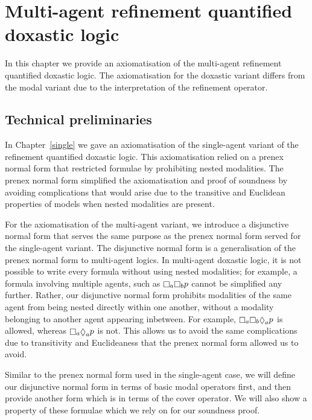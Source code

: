 \chapter{Multi-agent refinement quantified doxastic logic}\label{kd45}

In this chapter we provide an axiomatisation of the multi-agent refinement
quantified doxastic logic. The axiomatisation for the doxastic variant differs
from the modal variant due to the interpretation of the refinement operator.

\section{Technical preliminaries}

In Chapter~\ref{single} we gave an axiomatisation of the single-agent variant of
the refinement quantified doxastic logic. This axiomatisation relied on a
prenex normal form that restricted formulae by prohibiting nested modalities.
The prenex normal form simplified the axiomatisation and proof of soundness by
avoiding complications that would arise due to the transitive and Euclidean
properties of \classKD{} models when nested modalities are present.

For the axiomatisation of the multi-agent variant, we introduce a disjunctive
normal form that serves the same purpose as the prenex normal form served for
the single-agent variant. The disjunctive normal form is a generalisation of the
prenex normal form to multi-agent logics. In multi-agent doxastic logic, it is
not possible to write every formula without using nested modalities; for
example, a formula involving multiple agents, such as $\knows_a \knows_b p$
cannot be simplified any further. Rather, our disjunctive normal form prohibits
modalities of the same agent from being nested directly within one another,
without a modality belonging to another agent appearing inbetween. For example,
$\knows_a \knows_b \suspects_a p$ is allowed, whereas $\knows_a \suspects_a p$ is
not. This allows us to avoid the same complications due to transitivity and
Euclideaness that the prenex normal form allowed us to avoid.

Similar to the prenex normal form used in the single-agent case, we will define
our disjunctive normal form in terms of basic modal operators first, and then
provide another form which is in terms of the cover operator. We will also show
a property of these formulae which we rely on for our soundness proof.

